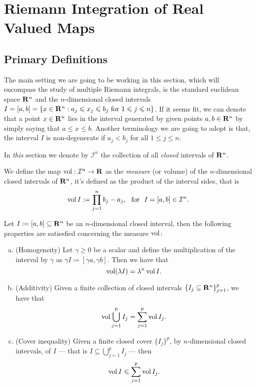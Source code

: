 \section{Riemann Integration of Real Valued Maps}

\subsection{Primary Definitions}

The main setting we are going to be working in this section, which will
encompass the study of multiple Riemann integrals, is the standard euclidean
space \(\mathbf{R}^n\) and the \(n\)-dimensional closed intervals \(I = [a, b] = \{x \in
\mathbf{R}^n : a_j \leqslant x_j \leqslant b_j \text{ for } 1 \leqslant j \leqslant n\}\). If it seems fit,
we can denote that a point \(x \in \mathbf{R}^n\) lies in the interval generated by
given points \(a, b \in \mathbf{R}^n\) by simply saying that \(a \leq x \leq
b\). Another terminology we are going to adopt is that, the interval \(I\) is
non-degenerate if \(a_j < b_j\) for all \(1 \leq j \leq n\).

\begin{notation}
In \emph{this} section we denote by \(\mathcal I^n\) the collection of all
\emph{closed} intervals of \(\mathbf{R}^n\).
\end{notation}

\begin{definition}
\label{def:interval-measure}
We define the map \(\operatorname{vol}: \mathcal I^n \to \mathbf{R}\) as the \emph{measure} (or
volume) of the \(n\)-dimensional closed intervals of \(\mathbf{R}^n\), it's defined as
the product of the interval sides, that is
\[
  \operatorname{vol} I := \prod_{j=1}^n b_j - a_j,
  \ \text{ for }\ I = [a, b] \in \mathcal I^n.
\]
\end{definition}

\begin{corollary}
\label{cor:interval-measure-properties}
Let \(I \coloneq [a, b] \subseteq \mathbf{R}^n\) be an \(n\)-dimensional closed
interval, then the following properties are satiesfied concerning the measure
\(\operatorname{vol}\):
\begin{enumerate}[(a)]\setlength\itemsep{0em}
\item (Homogeneity) Let \(\gamma \geq 0\) be a scalar and define the
  multiplication of the interval by \(\gamma\) as \(\gamma I \coloneq [\gamma
  a, \gamma b]\). Then we have that
  \[
    \operatorname{vol}(\lambda I) = \lambda^n \operatorname{vol} I.
  \]
\item (Additivity) Given a finite collection of closed intervals \(\{I_{j}
  \subseteq \mathbf{R}^n\}_{j = 1}^p\), we have that
  \[
    \operatorname{vol} \bigcup_{j=1}^p I_j = \sum_{j=1}^p \operatorname{vol} I_j.
  \]
\item (Cover inequality) Given a finite closed cover \(\{I_{j}\}^{p}\), by
  \(n\)-dimensional closed intervals, of \(I\) --- that is \(I \subseteq
  \bigcup_{j=1}^p I_j\) --- then
  \[
    \operatorname{vol} I \leqslant \sum_{j=1}^p \operatorname{vol} I_j.
  \]
\end{enumerate}
\end{corollary}

